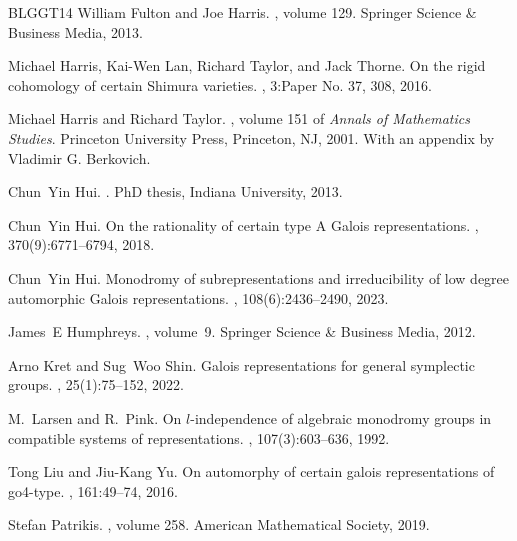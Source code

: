 \documentclass{amsart}
\theoremstyle{definition}
\numberwithin{equation}{section} %
\begin{document}
\begin{thebibliography}{BLGGT14}
William Fulton and Joe Harris.
, volume 129.
\newblock Springer Science \& Business Media, 2013.

Michael Harris, Kai-Wen Lan, Richard Taylor, and Jack Thorne.
\newblock On the rigid cohomology of certain {S}himura varieties.
, 3:Paper No. 37, 308, 2016.

Michael Harris and Richard Taylor.
, volume 151 of {\em Annals of Mathematics Studies}.
\newblock Princeton University Press, Princeton, NJ, 2001.
\newblock With an appendix by Vladimir G. Berkovich.

Chun~Yin Hui.
.
\newblock PhD thesis, Indiana University, 2013.

Chun~Yin Hui.
\newblock On the rationality of certain type {A} {G}alois representations.
, 370(9):6771--6794, 2018.

Chun~Yin Hui.
\newblock Monodromy of subrepresentations and irreducibility of low degree automorphic {G}alois representations.
, 108(6):2436--2490, 2023.

James~E Humphreys.
, volume~9.
\newblock Springer Science \& Business Media, 2012.

Arno Kret and Sug~Woo Shin.
\newblock Galois representations for general symplectic groups.
, 25(1):75--152, 2022.

M.~Larsen and R.~Pink.
\newblock On {$l$}-independence of algebraic monodromy groups in compatible systems of representations.
, 107(3):603--636, 1992.

Tong Liu and Jiu-Kang Yu.
\newblock On automorphy of certain galois representations of go4-type.
, 161:49--74, 2016.

Stefan Patrikis.
, volume 258.
\newblock American Mathematical Society, 2019.


\end{thebibliography}
\end{document}
